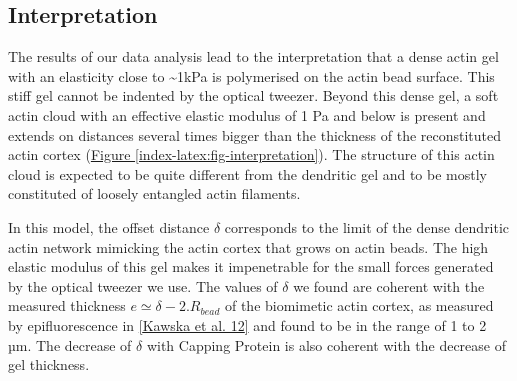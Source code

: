 \documentclass[A4paperpaper,11pt,english]{sphinxmanual}
\begin{document}
\subsection{Interpretation}
\label{index-latex:interpretation}
The results of our data analysis lead to the interpretation that
a dense actin gel with an elasticity close to \textasciitilde{}1kPa is polymerised
on the actin bead surface. This stiff gel
cannot be indented by the optical tweezer. Beyond this dense gel, a soft
actin cloud with an effective elastic modulus of 1 Pa and below is
present and extends on distances several times bigger than the thickness
of the reconstituted actin cortex (\hyperref[index-latex:fig-interpretation]{Figure  \ref*{index-latex:fig-interpretation}}). The
structure of this actin cloud is expected to be quite different from the
dendritic gel and to be mostly constituted of loosely entangled actin filaments.

In this model, the offset distance \(\delta\) corresponds to the limit of the dense
dendritic actin network mimicking the actin cortex that grows on actin beads.
The high elastic modulus of this gel makes it impenetrable for the small forces generated by the optical tweezer we use. The
values of \(\delta\) we found are coherent with the measured thickness \(e
\simeq \delta - 2.R_{bead}\) of the  biomimetic actin cortex, as measured by
epifluorescence in {\hyperref[index-latex:kawska2012]{{[}Kawska et al. 12{]}}} and found to be in the range of 1 to 2 µm. The decrease
of \(\delta\) with Capping Protein is also coherent with the decrease of gel
thickness.
\end{document}
